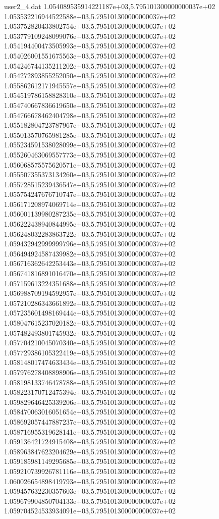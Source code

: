 \begin{filecontents}{user2_4.dat}
1.054089535914221187e+03,5.795101300000000037e+02
1.053532216944522588e+03,5.795101300000000037e+02
1.053752820433802754e+03,5.795101300000000037e+02
1.053779109248099076e+03,5.795101300000000037e+02
1.054194400473505993e+03,5.795101300000000037e+02
1.054026001551675563e+03,5.795101300000000037e+02
1.054246744135211202e+03,5.795101300000000037e+02
1.054272893855252050e+03,5.795101300000000037e+02
1.055862612171945557e+03,5.795101300000000037e+02
1.054519786158828310e+03,5.795101300000000037e+02
1.054740667836619650e+03,5.795101300000000037e+02
1.054766678462404798e+03,5.795101300000000037e+02
1.055182804723787967e+03,5.795101300000000037e+02
1.055013570765981285e+03,5.795101300000000037e+02
1.055234591538028099e+03,5.795101300000000037e+02
1.055260463069557773e+03,5.795101300000000037e+02
1.056068575575620571e+03,5.795101300000000037e+02
1.055507355373134260e+03,5.795101300000000037e+02
1.055728515239436547e+03,5.795101300000000037e+02
1.055754247676710747e+03,5.795101300000000037e+02
1.056171208974069714e+03,5.795101300000000037e+02
1.056001139980287235e+03,5.795101300000000037e+02
1.056222438940844995e+03,5.795101300000000037e+02
1.056248032283863722e+03,5.795101300000000037e+02
1.059432942999999796e+03,5.795101300000000037e+02
1.056494924587439982e+03,5.795101300000000037e+02
1.056716362642253443e+03,5.795101300000000037e+02
1.056741816891016470e+03,5.795101300000000037e+02
1.057159613224351688e+03,5.795101300000000037e+02
1.056988709194592957e+03,5.795101300000000037e+02
1.057210286343661892e+03,5.795101300000000037e+02
1.057235601498169444e+03,5.795101300000000037e+02
1.058047615237020182e+03,5.795101300000000037e+02
1.057482493801745932e+03,5.795101300000000037e+02
1.057704210045070340e+03,5.795101300000000037e+02
1.057729386105322419e+03,5.795101300000000037e+02
1.058148017474633434e+03,5.795101300000000037e+02
1.057976278408898906e+03,5.795101300000000037e+02
1.058198133746478788e+03,5.795101300000000037e+02
1.058223170712475394e+03,5.795101300000000037e+02
1.059829646425339206e+03,5.795101300000000037e+02
1.058470063016051654e+03,5.795101300000000037e+02
1.058692057447887237e+03,5.795101300000000037e+02
1.058716955319628141e+03,5.795101300000000037e+02
1.059136421724915408e+03,5.795101300000000037e+02
1.058963847623204629e+03,5.795101300000000037e+02
1.059185981149295685e+03,5.795101300000000037e+02
1.059210739926781116e+03,5.795101300000000037e+02
1.060026654898419793e+03,5.795101300000000037e+02
1.059457632230357603e+03,5.795101300000000037e+02
1.059679904850704133e+03,5.795101300000000037e+02
1.059704524533934091e+03,5.795101300000000037e+02

\end{filecontents}
